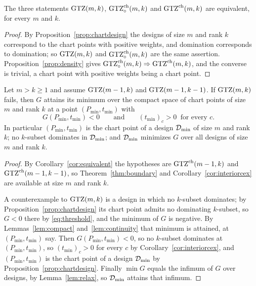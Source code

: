 \begin{corollary}\label{cor:equivalent}
The three statements $\mathrm{GTZ}(m,k)$, $\mathrm{GTZ}^{\mathrm{ch}}_{\circ}(m,k)$ and
$\mathrm{GTZ}^{\mathrm{ch}}(m,k)$ are equivalent, for every $m$ and $k$.
\end{corollary}

\begin{proof}
By Proposition~\ref{prop:chartdesign} the designs of size $m$ and rank
$k$ correspond to the chart points with positive weights, and domination
corresponds to domination; so $\mathrm{GTZ}(m,k)$ and
$\mathrm{GTZ}^{\mathrm{ch}}_{\circ}(m,k)$ are the same assertion.
Proposition~\ref{prop:density} gives
$\mathrm{GTZ}^{\mathrm{ch}}_{\circ}(m,k)\Rightarrow\mathrm{GTZ}^{\mathrm{ch}}(m,k)$, and
the converse is trivial, a chart point with positive weights being a
chart point.
\end{proof}

\begin{theorem}\label{thm:variational}
Let $m>k\ge1$ and assume $\mathrm{GTZ}(m-1,k)$ and $\mathrm{GTZ}(m-1,k-1)$.  If
$\mathrm{GTZ}(m,k)$ fails, then $G$ attains its minimum over the compact space of
chart points of size $m$ and rank $k$ at a point $(P_{\min},t_{\min})$
with
\[
  G(P_{\min},t_{\min})<0
  \qquad\text{and}\qquad
  (t_{\min})_c>0\ \text{ for every }c .
\]
In particular $(P_{\min},t_{\min})$ is the chart point of a design
$\mathcal{D}_{\min}$ of size $m$ and rank $k$; no $k$-subset dominates in
$\mathcal{D}_{\min}$; and $\mathcal{D}_{\min}$ minimizes $G$ over all designs of size $m$ and
rank $k$.
\end{theorem}

\begin{proof}
By Corollary~\ref{cor:equivalent} the hypotheses are
$\mathrm{GTZ}^{\mathrm{ch}}(m-1,k)$ and $\mathrm{GTZ}^{\mathrm{ch}}(m-1,k-1)$, so
Theorem~\ref{thm:boundary} and Corollary~\ref{cor:interiorcex} are
available at size $m$ and rank $k$.

A counterexample to $\mathrm{GTZ}(m,k)$ is a design in which no $k$-subset
dominates; by Proposition~\ref{prop:chartdesign} its chart point admits
no dominating $k$-subset, so $G<0$ there by \eqref{eq:threshold}, and the
minimum of $G$ is negative.  By Lemmas~\ref{lem:compact}
and~\ref{lem:continuity} that minimum is attained, at
$(P_{\min},t_{\min})$ say.  Then $G(P_{\min},t_{\min})<0$, so no
$k$-subset dominates at $(P_{\min},t_{\min})$, so $(t_{\min})_c>0$ for
every $c$ by Corollary~\ref{cor:interiorcex}, and $(P_{\min},t_{\min})$
is the chart point of a design $\mathcal{D}_{\min}$ by
Proposition~\ref{prop:chartdesign}.
Finally $\min G$ equals the infimum of $G$ over designs, by
Lemma~\ref{lem:relax}, so $\mathcal{D}_{\min}$ attains that infimum.
\end{proof}

